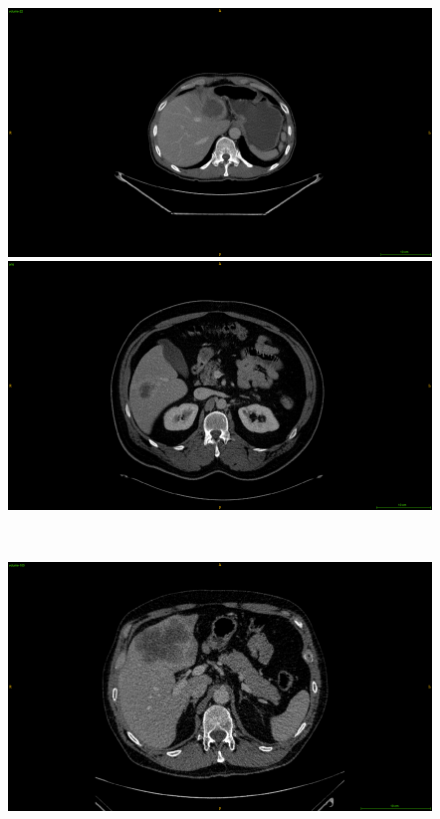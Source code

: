 \documentclass[]{article}
\begin{document}
\begin{figure}[!ht]
	\centering
	\begin{minipage}{0.45\linewidth}
		\includegraphics[width=\linewidth]{../Contributions/images/ResizeLITS_examplePatientSmallTumor_2}
	\end{minipage} \hspace{-0.1cm}
	\begin{minipage}{0.45\linewidth}
		\includegraphics[width=\linewidth]{../Contributions/images/ResizeTCIA_examplePatientSmallTumor}
	\end{minipage} \\
	\begin{minipage}{0.45\linewidth}
		\includegraphics[width=\linewidth]{../Contributions/images/ResizeLITS_examplePatientLargeTumor}

\end{minipage}
\end{figure}
\end{document}
